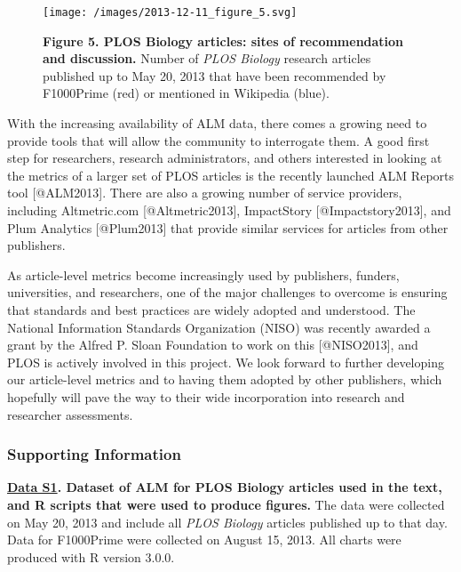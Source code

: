\begin{figure}[htbp]
\centering
\texttt{[image: /images/2013-12-11\_figure\_5.svg]}
\caption{\textbf{Figure 5. PLOS Biology articles: sites of
recommendation and discussion.} Number of \emph{PLOS Biology} research
articles published up to May 20, 2013 that have been recommended by
F1000Prime (red) or mentioned in Wikipedia (blue).}
\end{figure}

With the increasing availability of ALM data, there comes a growing need
to provide tools that will allow the community to interrogate them. A
good first step for researchers, research administrators, and others
interested in looking at the metrics of a larger set of PLOS articles is
the recently launched ALM Reports tool {[}@ALM2013{]}. There are also a
growing number of service providers, including Altmetric.com
{[}@Altmetric2013{]}, ImpactStory {[}@Impactstory2013{]}, and Plum
Analytics {[}@Plum2013{]} that provide similar services for articles
from other publishers.

As article-level metrics become increasingly used by publishers,
funders, universities, and researchers, one of the major challenges to
overcome is ensuring that standards and best practices are widely
adopted and understood. The National Information Standards Organization
(NISO) was recently awarded a grant by the Alfred P. Sloan Foundation to
work on this {[}@NISO2013{]}, and PLOS is actively involved in this
project. We look forward to further developing our article-level metrics
and to having them adopted by other publishers, which hopefully will
pave the way to their wide incorporation into research and researcher
assessments.

\subsubsection{Supporting Information}\label{supporting-information}

\textbf{\href{http://dx.doi.org/10.1371/journal.pbio.1001687.s001}{Data
S1}. Dataset of ALM for PLOS Biology articles used in the text, and R
scripts that were used to produce figures.} The data were collected on
May 20, 2013 and include all \emph{PLOS Biology} articles published up
to that day. Data for F1000Prime were collected on August 15, 2013. All
charts were produced with R version 3.0.0.
